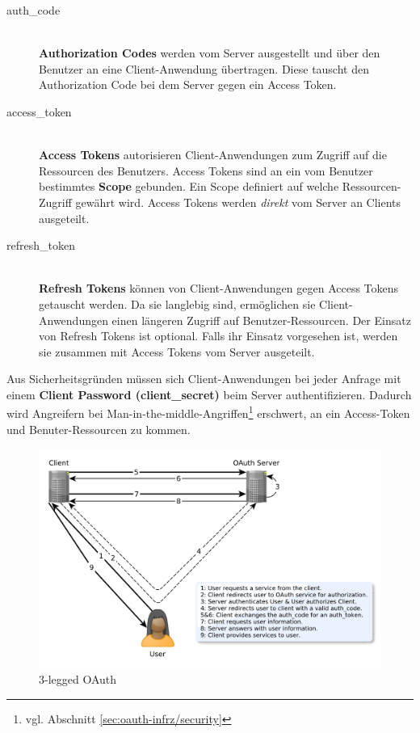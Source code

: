 \documentclass[12pt,a4paper,pointednumbers,abstracton]{scrartcl}
\begin{document}
\begin{description}
	\item[auth\_code] \hfill \\
		\textbf{Authorization Codes} werden vom Server ausgestellt und über den Benutzer an eine Client-Anwendung übertragen.
		Diese tauscht den Authorization Code bei dem Server gegen ein Access Token.
	\item[access\_token] \hfill \\
		\textbf{Access Tokens} autorisieren Client-Anwendungen zum Zugriff auf die Ressourcen des Benutzers.
		Access Tokens sind an ein vom Benutzer bestimmtes \textbf{Scope} gebunden.
		Ein Scope definiert auf welche Ressourcen-Zugriff gewährt wird.
		Access Tokens werden \emph{direkt} vom Server an Clients ausgeteilt.
	\item[refresh\_token] \hfill \\
		\textbf{Refresh Tokens} können von Client-Anwendungen gegen Access Tokens getauscht werden.
		Da sie langlebig sind, ermöglichen sie Client-Anwendungen einen längeren Zugriff auf Benutzer-Ressourcen.
		Der Einsatz von Refresh Tokens ist optional.
		Falls ihr Einsatz vorgesehen ist, werden sie zusammen mit Access Tokens vom Server ausgeteilt.
\end{description}

Aus Sicherheitsgründen müssen sich Client-Anwendungen bei jeder Anfrage mit einem \textbf{Client Password (client\_secret)} beim Server authentifizieren.
Dadurch wird Angreifern bei Man-in-the-middle-Angriffen\footnote{vgl. Abschnitt \ref{sec:oauth-infrz/security}} erschwert, an ein Access-Token und Benuter-Ressourcen zu kommen.

\begin{figure}[h!]
\centering
\includegraphics[width=15.5cm]{img/oauth2_workflow}
\caption{3-legged OAuth}
\label{pic:oauth2_workflow}
\end{figure}
\end{document}
